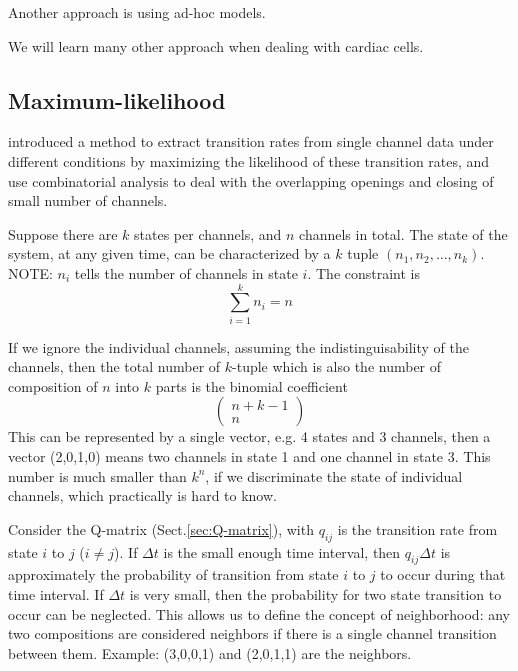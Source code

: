 Another approach is using ad-hoc models.


We will learn many other approach when dealing with cardiac cells.





\subsection{Maximum-likelihood}

\citep{Horn1983} introduced a method to extract transition rates from single
channel data under different conditions by maximizing the likelihood of these
transition rates, and use combinatorial analysis to deal with the overlapping
openings and closing of small number of channels.

Suppose there are $k$ states per channels, and $n$ channels in total. The state
of the system, at any given time, can be characterized by a $k$ tuple $(n_1,
n_2, \ldots, n_k)$. NOTE: $n_i$ tells the number of channels in state $i$. The
constraint is
\begin{equation}
\sum_{i=1}^k n_i = n
\end{equation}


If we ignore the individual channels, assuming the indistinguisability of the
channels, then the total number of $k$-tuple which is also the number of
composition of $n$ into $k$ parts is the binomial coefficient
\begin{equation}
\left(\begin{array}{c} n+k-1 \\ n \end{array} \right)
\end{equation}
This can be represented by a single vector, e.g. 4 states and 3 channels, then a
vector (2,0,1,0) means two channels in state 1 and one channel in state 3. This
number is much smaller than $k^n$, if we discriminate the state of individual
channels, which practically is hard to know.

Consider the Q-matrix (Sect.\ref{sec:Q-matrix}), with $q_{ij}$ is the transition
rate from state $i$ to $j$ ($i\ne j$). If $\Delta t$ is the small enough time
interval, then $q_{ij}\Delta t$ is approximately the probability of transition
from state $i$ to $j$ to occur during that time interval. If $\Delta t$ is very
small, then the probability for two state transition to occur can be neglected.
This allows us to define the concept of neighborhood: any two compositions are
considered neighbors if there is a single channel transition between them.
Example: (3,0,0,1) and (2,0,1,1) are the neighbors.

